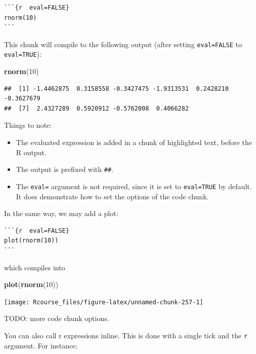\documentclass[]{book}
\newenvironment{Shaded}{\begin{snugshade}}{\end{snugshade}}
\newcommand{\KeywordTok}[1]{\textcolor[rgb]{0.13,0.29,0.53}{\textbf{#1}}}
\newcommand{\DecValTok}[1]{\textcolor[rgb]{0.00,0.00,0.81}{#1}}
\newcommand{\NormalTok}[1]{#1}
\providecommand{\tightlist}{%
  \setlength{\itemsep}{0pt}\setlength{\parskip}{0pt}}
\theoremstyle{definition}
\theoremstyle{definition}
\theoremstyle{definition}
\theoremstyle{remark}
\begin{document}
\begin{verbatim}
```{r  eval=FALSE}
rnorm(10)
```
\end{verbatim}

This chunk will compile to the following output (after setting
\texttt{eval=FALSE} to \texttt{eval=TRUE}):

\begin{Shaded}
\begin{Highlighting}[]
\KeywordTok{rnorm}\NormalTok{(}\DecValTok{10}\NormalTok{)}
\end{Highlighting}
\end{Shaded}

\begin{verbatim}
##  [1] -1.4462875  0.3158558 -0.3427475 -1.9313531  0.2428210 -0.3627679
##  [7]  2.4327289  0.5920912 -0.5762008  0.4066282
\end{verbatim}

Things to note:

\begin{itemize}
\tightlist
\item
  The evaluated expression is added in a chunk of highlighted text,
  before the R output.
\item
  The output is prefixed with \texttt{\#\#}.
\item
  The \texttt{eval=} argument is not required, since it is set to
  \texttt{eval=TRUE} by default. It does demonstrate how to set the
  options of the code chunk.
\end{itemize}

In the same way, we may add a plot:

\begin{verbatim}
```{r  eval=FALSE}
plot(rnorm(10))
```
\end{verbatim}

which compiles into

\begin{Shaded}
\begin{Highlighting}[]
\KeywordTok{plot}\NormalTok{(}\KeywordTok{rnorm}\NormalTok{(}\DecValTok{10}\NormalTok{))}
\end{Highlighting}
\end{Shaded}

\texttt{[image: Rcourse\_files/figure-latex/unnamed-chunk-257-1]}

TODO: more code chunk options.

You can also call r expressions inline. This is done with a single tick
and the \texttt{r} argument. For instance:
\end{document}
